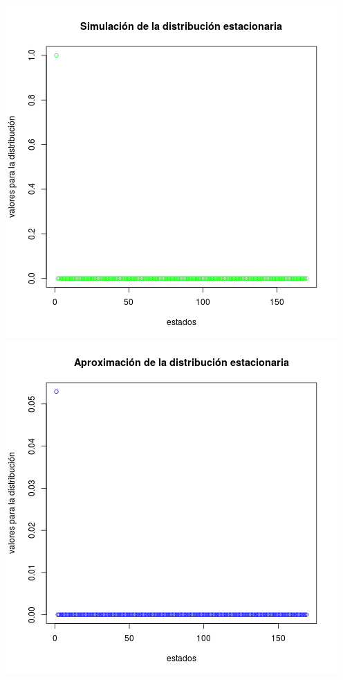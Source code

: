 \documentclass[paper=letter, fontsize=12pt]{scrartcl} %
\numberwithin{equation}{section} %
\numberwithin{figure}{section} %
\numberwithin{table}{section} %
\begin{document}
\includegraphics[scale=0.5]{ej3_2.png} \includegraphics[scale=0.5]{ej3_3.png}
\end{document}
